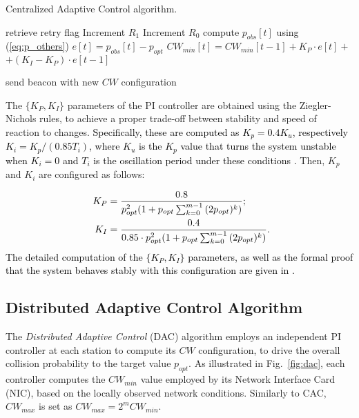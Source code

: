 \documentclass[a4paper,10pt]{article}
\newcommand{\revs}[1]{\textcolor{black}{#1}}
\begin{document}
\begin{algorithm}[!t]
 \caption{Centralized Adaptive Control algorithm.}
 \label{alg:cac}
 \begin{algorithmic}[1]
		\Repeat
					\State retrieve retry flag			
						\State Increment $R_1$
					\Else
						\State Increment $R_0$
					\EndIf
			\EndIf
		\State compute $p_{obs}[t]$ using (\ref{eq:p_others}) 	
\State $e[t] = p_{obs}[t]-p_{opt}$	
\State $CW_{min}[t] = CW_{min}[t - 1] + K_P \cdot e[t] + $
		\State \hspace{4.2em} $ + (K_I - K_P) \cdot e[t - 1]$
			
		\State send beacon with new $CW$ configuration
	\EndWhile
\end{algorithmic}
\end{algorithm}


The $\{K_P,K_I\}$ parameters of the PI controller are obtained using the Ziegler-Nichols rules, to achieve a proper trade-off between stability and speed of reaction to changes.
\revs{Specifically, these are computed as $K_p = 0.4 K_u$, respectively $K_i = K_p/(0.85T_i)$, where $K_u$ is the $K_p$ value that turns the system unstable when $K_i = 0$ and $T_i$ is the oscillation period under these conditions \cite{franklin}.} Then, $K_p$ and $K_i$ are configured as follows:

\begin{equation}
\left.
\right.\begin{aligned}
K_P &= \frac{0.8}{p_{opt}^2 (1 + p_{opt}\sum_{k = 0}^{m-1}{(2p_{opt})^k})}; \\
K_I &= \frac{0.4}{0.85 \cdot p_{opt}^2 (1 + p_{opt}\sum_{k = 0}^{m-1}{(2p_{opt})^k})}.
\end{aligned}
\label{eq:ctrl_params}
\vspace*{1em}
\end{equation}
\revs{The detailed computation of the  $\{K_P,K_I\}$ parameters, as well as the formal proof that the system behaves stably with this configuration are given in \cite{patras09monet}.}



\subsection{Distributed Adaptive Control Algorithm}

The \emph{Distributed Adaptive Control} (DAC) algorithm \cite{patras10tmc} employs an independent PI controller at each station to compute its $CW$ configuration, to drive the overall collision probability to the target value $p_{opt}$. As illustrated in Fig.~\ref{fig:dac}, each controller computes the $CW_{min}$ value employed by its Network Interface Card (NIC), based on the locally observed network conditions. Similarly to CAC, $CW_{max}$ is set as $CW_{max} = 2^m CW_{min}$.
\end{document}
